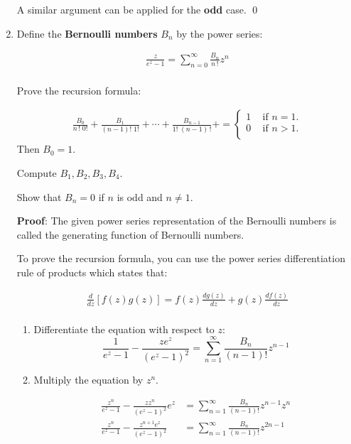 \begin{enumerate}
    A similar argument can be applied for the \textbf{odd} case.
    \qed
  
    \item Define the \textbf{Bernoulli numbers} $B_n$ by the power series:
  
    \begin{align*}
      \frac{z}{e^z - 1} = \sum_{n = 0}^{\infty}\frac{B_n}{n\,!}z^n \\
    \end{align*}
  
    Prove the recursion formula:
  
    \begin{align*}
      \frac{B_0}{n \, ! \; 0!} + \frac{B_1}{(n - 1)! \; 1!} + \cdots + \frac{B_{n - 1}}{1! \; (n - 1)\,!} + = 
      \begin{cases}
        1 \;\;\; \text{   if } n = 1. \\
        0 \;\;\; \text{   if } n > 1. \\
      \end{cases}
    \end{align*}
    Then $B_0 = 1.$
    
    Compute $B_1, B_2, B_3, B_4.$
    
    Show that $B_n = 0$ if $n$ is odd and $n \not = 1.$

    \textbf{Proof}:
    The given power series representation of the Bernoulli numbers is called the 
    generating function of Bernoulli numbers.

    To prove the recursion formula, you can use the power series differentiation rule of products
    which states that:

    \begin{align*}
      \frac{d}{dz}[f(z)g(z)] = f(z)\frac{dg(z)}{dz}+ g(z)\frac{df(z)}{dz} \\
    \end{align*}

    \begin{enumerate}

      \item Differentiate the equation with respect to $z$:
      \[\frac{1}{e^z - 1} - \frac{ze^z}{(e^z - 1)^2} = \sum_{n = 1}^{\infty}\frac{B_n}{(n-1)!}z^{n-1}\]

      \item Multiply the equation by $z^n$.
      
      \begin{align*}
        \frac{z^n}{e^z - 1} - \frac{z z^n}{(e^z - 1)^2}e^z &= \sum_{n = 1}^{\infty}\frac{B_n}{(n-1)!}z^{n-1} z^n \\
        \frac{z^n}{e^z - 1} - \frac{z^{n + 1} e^z}{(e^z - 1)^2} &= \sum_{n = 1}^{\infty}\frac{B_n}{(n-1)!}z^{2n-1} \\
      \end{align*}


\end{enumerate}
\end{enumerate}
